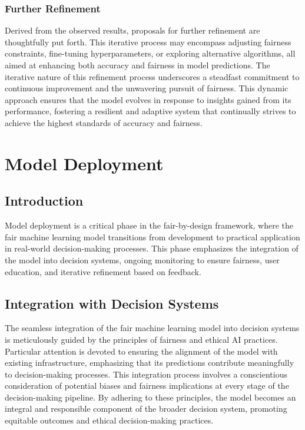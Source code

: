 \documentclass[12pt,a4paper,openright,twoside]{book}
\begin{document}
\subsubsection{Further Refinement}

Derived from the observed results, proposals for further refinement are thoughtfully put forth. This iterative process may encompass adjusting fairness constraints, fine-tuning hyperparameters, or exploring alternative algorithms, all aimed at enhancing both accuracy and fairness in model predictions. The iterative nature of this refinement process underscores a steadfast commitment to continuous improvement and the unwavering pursuit of fairness. This dynamic approach ensures that the model evolves in response to insights gained from its performance, fostering a resilient and adaptive system that continually strives to achieve the highest standards of accuracy and fairness.

\section{Model Deployment}
\label{section:model-deployment}

\subsection{Introduction}

Model deployment is a critical phase in the fair-by-design framework, where the fair machine learning model transitions from development to practical application in real-world decision-making processes. This phase emphasizes the integration of the model into decision systems, ongoing monitoring to ensure fairness, user education, and iterative refinement based on feedback.

\subsection{Integration with Decision Systems}

The seamless integration of the fair machine learning model into decision systems is meticulously guided by the principles of fairness and ethical AI practices. Particular attention is devoted to ensuring the alignment of the model with existing infrastructure, emphasizing that its predictions contribute meaningfully to decision-making processes. This integration process involves a conscientious consideration of potential biases and fairness implications at every stage of the decision-making pipeline. By adhering to these principles, the model becomes an integral and responsible component of the broader decision system, promoting equitable outcomes and ethical decision-making practices.
\end{document}
